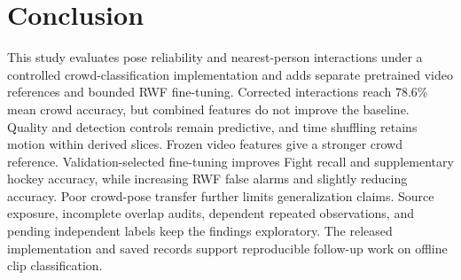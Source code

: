 \section{Conclusion}
This study evaluates pose reliability and nearest-person interactions under a controlled crowd-classification implementation and adds separate pretrained video references and bounded RWF fine-tuning. Corrected interactions reach 78.6\% mean crowd accuracy, but combined features do not improve the baseline. Quality and detection controls remain predictive, and time shuffling retains motion within derived slices. Frozen video features give a stronger crowd reference. Validation-selected fine-tuning improves Fight recall and supplementary hockey accuracy, while increasing RWF false alarms and slightly reducing accuracy. Poor crowd-pose transfer further limits generalization claims. Source exposure, incomplete overlap audits, dependent repeated observations, and pending independent labels keep the findings exploratory. The released implementation and saved records support reproducible follow-up work on offline clip classification.
